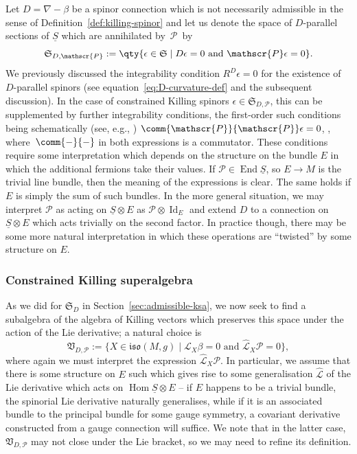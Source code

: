 \documentclass[pdftex]{sigma}
\numberwithin{equation}{section}
\newcommand{\fiso}{\mathfrak{iso}}
\newcommand{\fS}{\mathfrak{S}}
\newcommand{\fV}{\mathfrak{V}}
\newcommand{\eL}{\mathscr{L}}
\newcommand{\eP}{\mathscr{P}}
\newcommand{\Sbundle}{\underline{S}}
\newcommand{\eLhat}{\widehat{\eL}}
\newcommand{\1}{\mathbbm{1}}
\DeclareMathOperator{\Id}{Id}
\DeclareMathOperator{\End}{End}
\DeclareMathOperator{\Hom}{Hom}
\begin{document}
Let $D=\nabla-\beta$ be a spinor connection which is not necessarily admissible in the sense of Definition~\ref{def:killing-spinor} and let us denote the space of $D$-parallel sections of $\Sbundle$ which are annihilated by~$\eP$~by
\[
	\fS_{D,\eP} := \qty{\epsilon\in\fS\mid D\epsilon = 0 \text{ and } \eP\epsilon = 0}.
\]
We previously discussed the integrability condition $R^D\epsilon=0$ for the existence of $D$-parallel spinors (see equation~\eqref{eq:D-curvature-def} and the subsequent discussion). In the case of constrained Killing spinors $\epsilon\in\fS_{D,\eP}$, this can be supplemented by further integrability conditions, the first-order such conditions being schematically (see, e.g., \cite{Gran2019})
$\comm{\eP}{\eP}\epsilon = 0$, \smash{$\widehat{D}\eP \epsilon := \comm{D}{\eP}\epsilon = 0$},
where~${\comm{-}{-}}$ in both expressions is a commutator. These conditions require some interpretation which depends on the structure on the bundle $E$ in which the additional fermions take their values. If $\eP\in\End\Sbundle$, so $E\to M$ is the trivial line bundle, then the meaning of the expressions is clear. The same holds if $E$ is simply the sum of such bundles. In the more general situation, we may interpret $\eP$ as acting on $\Sbundle\otimes E$ as $\eP\otimes\Id_E$ and extend $D$ to a connection on $\Sbundle\otimes E$ which acts trivially on the second factor. In practice though, there may be some more natural interpretation in which these operations are ``twisted'' by some structure on $E$.

\subsubsection{Constrained Killing superalgebra}

As we did for $\fS_D$ in Section~\ref{sec:admissible-ksa}, we now seek to find a subalgebra of the algebra of Killing vectors which preserves this space under the action of the Lie derivative; a natural choice is
\[
	\fV_{D,\eP} := \big\{X\in\fiso(M,g) \mid \eL_X \beta = 0 \text{ and } \eLhat_X \eP = 0\big\},
\]
where again we must interpret the expression $\eLhat_X \eP$. In particular, we assume that there is some structure on $E$ such which gives rise to some generalisation $\eLhat$ of the Lie derivative which acts on $\Hom\Sbundle\otimes E$ -- if $E$ happens to be a trivial bundle, the spinorial Lie derivative naturally generalises, while if it is an associated bundle to the principal bundle for some gauge symmetry, a covariant derivative constructed from a gauge connection will suffice. We note that in the latter case, $\fV_{D,\eP}$ may not close under the Lie bracket, so we may need to refine its definition.
\end{document}
